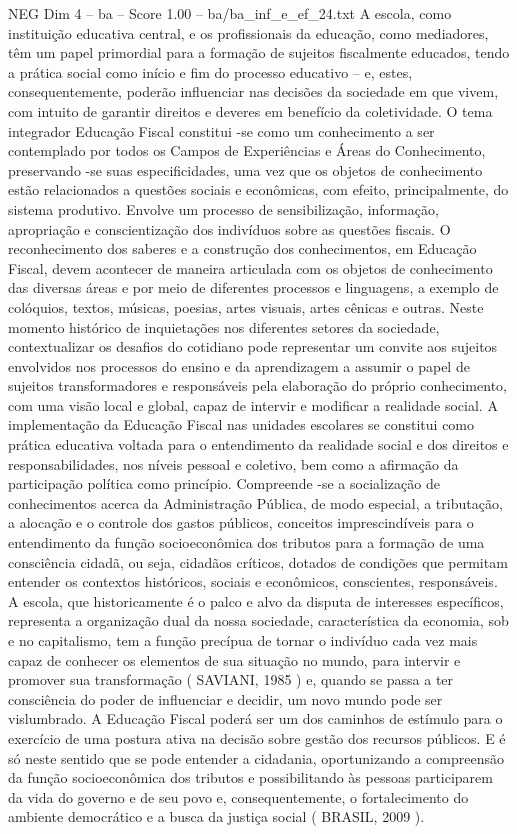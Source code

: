 \begin{textsample}{NEG Dim 4 – ba – Score 1.00 – ba/ba\_inf\_e\_ef\_24.txt}
A escola, como instituição educativa central, e os profissionais da educação, como mediadores, têm um papel primordial para a formação de sujeitos fiscalmente educados, tendo a prática social como início e fim do processo educativo – e, estes, consequentemente, poderão influenciar nas decisões da sociedade em que vivem, com intuito de garantir direitos e deveres em benefício da coletividade.
O tema integrador Educação Fiscal constitui -se como um conhecimento a ser contemplado por todos os Campos de Experiências e Áreas do Conhecimento, preservando -se suas especificidades, uma vez que os objetos de conhecimento estão relacionados a questões sociais e econômicas, com efeito, principalmente, do sistema produtivo.
Envolve um processo de sensibilização, informação, apropriação e conscientização dos indivíduos sobre as questões fiscais.
O reconhecimento dos saberes e a construção dos conhecimentos, em Educação Fiscal, devem acontecer de maneira articulada com os objetos de conhecimento das diversas áreas e por meio de diferentes processos e linguagens, a exemplo de colóquios, textos, músicas, poesias, artes visuais, artes cênicas e outras.
Neste momento histórico de inquietações nos diferentes setores da sociedade, contextualizar os desafios do cotidiano pode representar um convite aos sujeitos envolvidos nos processos do ensino e da aprendizagem a assumir o papel de sujeitos transformadores e responsáveis pela elaboração do próprio conhecimento, com uma visão local e global, capaz de intervir e modificar a realidade social.
A implementação da Educação Fiscal nas unidades escolares se constitui como prática educativa voltada para o entendimento da realidade social e dos direitos e responsabilidades, nos níveis pessoal e coletivo, bem como a afirmação da participação política como princípio.
Compreende -se a socialização de conhecimentos acerca da Administração Pública, de modo especial, a tributação, a alocação e o controle dos gastos públicos, conceitos imprescindíveis para o entendimento da função socioeconômica dos tributos para a formação de uma consciência cidadã, ou seja, cidadãos críticos, dotados de condições que permitam entender os contextos históricos, sociais e econômicos, conscientes, responsáveis.
A escola, que historicamente é o palco e alvo da disputa de interesses específicos, representa a organização dual da nossa sociedade, característica da economia, sob e no capitalismo, tem a função precípua de tornar o indivíduo cada vez mais capaz de conhecer os elementos de sua situação no mundo, para intervir e promover sua transformação ( SAVIANI, 1985 ) e, quando se passa a ter consciência do poder de influenciar e decidir, um novo mundo pode ser vislumbrado.
A Educação Fiscal poderá ser um dos caminhos de estímulo para o exercício de uma postura ativa na decisão sobre gestão dos recursos públicos.
E é só neste sentido que se pode entender a cidadania, oportunizando a compreensão da função socioeconômica dos tributos e possibilitando às pessoas participarem da vida do governo e de seu povo e, consequentemente, o fortalecimento do ambiente democrático e a busca da justiça social ( BRASIL, 2009 ).

\end{textsample}
